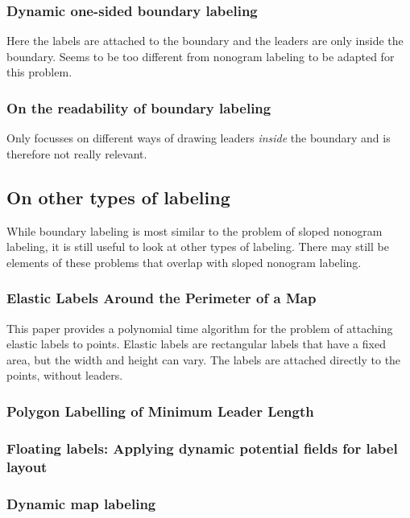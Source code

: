 \documentclass[a4paper]{article}
\begin{document}
\subsubsection{Dynamic one-sided boundary labeling \cite{nollenburg2010dynamic}}
Here the labels are attached to the boundary and the leaders are only inside the boundary. Seems to be too different from nonogram labeling to be adapted for this problem.


\subsubsection{On the readability of boundary labeling \cite{barth2015readability}}
Only focusses on different ways of drawing leaders \textit{inside} the boundary and is therefore not really relevant.

\subsection{On other types of labeling}
While boundary labeling is most similar to the problem of sloped nonogram labeling, it is still useful to look at other types of labeling. There may still be elements of these problems that overlap with sloped nonogram labeling.

\subsubsection{Elastic Labels Around the Perimeter of a Map \cite{iturriaga1999elastic}}
This paper provides a polynomial time algorithm for the problem of attaching elastic labels to points. Elastic labels are rectangular labels that have a fixed area, but the width and height can vary. The labels are attached directly to the points, without leaders.

\subsubsection{Polygon Labelling of Minimum Leader Length \cite{Bekos:2006:PLM:1151903.1151906}}

\subsubsection{Floating labels: Applying dynamic potential fields for label layout \cite{hartmann2004floating}}

\subsubsection{Dynamic map labeling \cite{been2006dynamic}}
\end{document}
